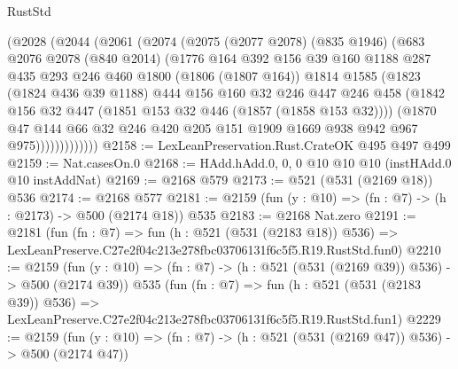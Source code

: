 \begin{lexlean}{RustStd}
\begin{coremodule}
            (@2028
              (@2044
                (@2061
                  (@2074
                    (@2075
                      (@2077 @2078)
                      (@835 @1946)
                      (@683
                        @2076
                        @2078
                        (@840 @2014)
                        (@1776
                          @164
                          @392
                          @156
                          @39
                          @160
                          @1188
                          @287
                          @435
                          @293
                          @246
                          @460
                          @1800
                          (@1806 (@1807 @164))
                          @1814
                          @1585
                          (@1823
                            (@1824 @436 @39 @1188)
                            @444
                            @156
                            @160
                            @32
                            @246
                            @447
                            @246
                            @458
                            (@1842 @156 @32 @447 (@1851 @153 @32 @446 (@1857 (@1858 @153 @32))))
                            (@1870
                              @47
                              @144
                              @66
                              @32
                              @246
                              @420
                              @205
                              @151
                              @1909
                              @1669
                              @938
                              @942
                              @967
                              @975)))))))))))))
@2158 := LexLeanPreservation.Rust.CrateOK @495 @497 @499
@2159 := Nat.casesOn.{0}
@2168 := HAdd.hAdd.{0, 0, 0} @10 @10 @10 (instHAdd.{0} @10 instAddNat)
@2169 := @2168 @579
@2173 := @521 (@531 (@2169 @18)) @536
@2174 := @2168 @577
@2181 := @2159 (fun (y : @10) => (fn : @7) -> (h : @2173) -> @500 (@2174 @18)) @535
@2183 := @2168 Nat.zero
@2191 := @2181
    (fun (fn : @7) =>
    fun (h : @521 (@531 (@2183 @18)) @536) =>
    LexLeanPreserve.C27e2f04c213e278fbc03706131f6c5f5.R19.RustStd.fun0)
@2210 := @2159
    (fun (y : @10) => (fn : @7) -> (h : @521 (@531 (@2169 @39)) @536) -> @500 (@2174 @39))
    @535
    (fun (fn : @7) =>
    fun (h : @521 (@531 (@2183 @39)) @536) =>
    LexLeanPreserve.C27e2f04c213e278fbc03706131f6c5f5.R19.RustStd.fun1)
@2229 := @2159
    (fun (y : @10) => (fn : @7) -> (h : @521 (@531 (@2169 @47)) @536) -> @500 (@2174 @47))

\end{coremodule}
\end{lexlean}
